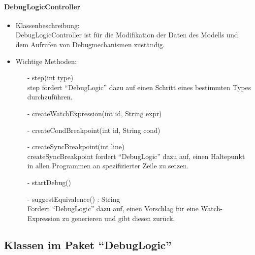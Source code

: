 \documentclass[parskip=full]{scrartcl}
\begin{document}
    \paragraph{DebugLogicController}
        \begin{itemize}
            \item Klassenbeschreibung:\\
                DebugLogicController ist für die Modifikation der Daten des Modells und dem
                Aufrufen von Debugmechanismen zuständig.\\

            \item Wichtige Methoden:\\
                \begin{itemize}
                    \item[-] step(int type)\\
                        step fordert \enquote{DebugLogic} dazu auf einen Schritt 
                        eines bestimmten Types durchzuführen.\\

                    \item[-] createWatchExpression(int id, String expr)\\

                    \item[-] createCondBreakpoint(int id, String cond)\\

                    \item[-] createSyncBreakpoint(int line)\\
                        createSyncBreakpoint fordert \enquote{DebugLogic} dazu auf, einen
                        Haltepunkt in allen Programmen an spezifizierter Zeile zu setzen.\\

                    \item[-] startDebug()

                    \item[-] suggestEquivalence() : String\\
                        Fordert \enquote{DebugLogic} dazu auf, einen Vorschlag für eine
                        Watch-Expression zu generieren und gibt diesen zurück.
                \end{itemize}
        \end{itemize}
\subsection{Klassen im Paket \enquote{DebugLogic}}
\end{document}
